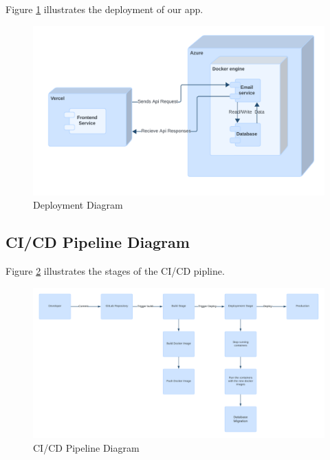 Figure \ref{fig:Sprint 3 Deployment Diagram} illustrates the deployment of our app.


\begin{figure}[ht]
	\centering
	\includegraphics[width=0.7\linewidth]{Images/Sprint3/deployment diagram v2.png}
	\caption{ Deployment Diagram}
	\label{fig:Sprint 3 Deployment Diagram}
\end{figure}

\subsection{CI/CD Pipeline Diagram}

Figure \ref{fig:Sprint 3 CI/CD Pipeline Diagram} illustrates the stages of the CI/CD pipline.

\begin{figure}[ht]
	\centering
	\includegraphics[width=0.7\linewidth]{Images/Sprint3/ci_pipline_diag.png}
	\caption{ CI/CD Pipeline Diagram}
	\label{fig:Sprint 3 CI/CD Pipeline Diagram}
\end{figure}
